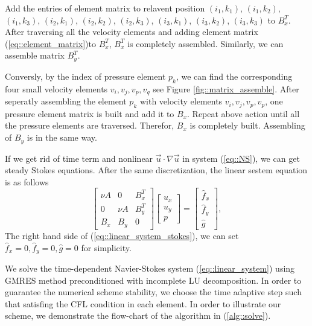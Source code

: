 \documentclass[a4paper, 11pt]{article}
\begin{document}
   Add the entries of element matrix to relavent position
   $(i_1,k_1)$, $(i_1, k_2)$, $(i_1, k_3)$, $(i_2, k_1)$, $(i_2, k_2)$,
   $(i_2,k_3)$, $(i_3, k_1)$, $(i_3, k_2)$, $(i_3, k_3)$ to  $B_x^T$. 
   After traversing all the velocity elements and adding element
   matrix (\ref{eq::element_matrix})to $B_x^T$, $B_x^T$ is completely
   assembled. Similarly, we can assemble matrix $B_y^T$.

   Conversly, by the index of pressure element $p_k$, we can find the 
   corresponding four small velocity elements $v_i, v_j, v_p, v_q$ see
   Figure \ref{fig::matrix_assemble}. After seperatly assembling the
   element $p_k$ with velocity elements $v_i, v_j, v_p, v_p$,  one
   pressure element matrix is built and add it to $B_x$. Repeat above 
   action until all the pressure elements are traversed. Therefor,
   $B_x$ is completely built. Assembling of $B_y$ is in the same way.    
   
   If we get rid of time term and nonlinear $\vec{u} \cdot \nabla
   \vec{u}$ in system (\ref{eq::NS}), we can get steady Stokes
   equations. After the same discretization, the linear sestem equation
   is as follows
   \begin{equation}
     \left[
       \begin{array}{lll}
         \nu A & 0 & B_x^T \\
         0 & \nu A  & B_y^T \\
         B_x & B_y & 0
       \end{array}
     \right]
     \left[
       \begin{array}{c}
          u_x \\
          u_y \\
          p
       \end{array}
     \right] = 
     \left[
       \begin{array}{c}
         \hat{f}_x \\
         \hat{f}_y \\
         \hat{g}
       \end{array}
     \right],
     \label{eq::linear_system_stokes}
   \end{equation}   
   The right hand side of (\ref{eq::linear_system_stokes}), we can set
   $\hat{f}_x = 0, \hat{f}_y = 0, \hat{g} = 0$ for simplicity.

   We solve the time-dependent Navier-Stokes system
   (\ref{eq::linear_system}) using GMRES method preconditioned with
   incomplete LU decomposition. In order to guarantee the numerical
   scheme stability, we choose the time adaptive step such that
   satisfing the CFL condition in each element. In order to illustrate
   our scheme, we demonstrate the flow-chart of the algorithm in
   (\ref{alg::solve}).
\end{document}
